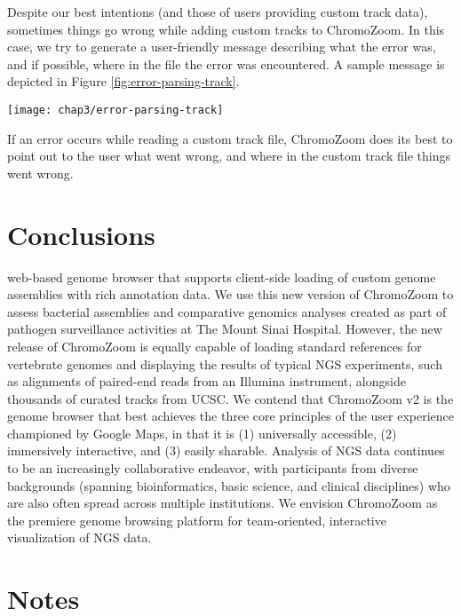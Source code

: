 Despite our best intentions (and those of users providing custom track data), sometimes things go wrong while adding custom tracks to ChromoZoom. In this case, we try to generate a user-friendly message describing what the error was, and if possible, where in the file the error was encountered. A sample message is depicted in Figure \ref{fig:error-parsing-track}.

\begin{marginfigure}
  \texttt{[image: chap3/error-parsing-track]}               
  \caption[Handling errors in parsing custom tracks]{If an error occurs while reading a custom track file, ChromoZoom does its best to point out to the user what went wrong, and where in the custom track file things went wrong.}
  \label{fig:error-parsing-track}
\end{marginfigure}

\section{Conclusions}

 web-based genome browser that supports client-side loading of custom genome assemblies with rich annotation data. We use this new version of ChromoZoom to assess bacterial assemblies and comparative genomics analyses created as part of pathogen surveillance activities at The Mount Sinai Hospital. However, the new release of ChromoZoom is equally capable of loading standard references for vertebrate genomes and displaying the results of typical NGS experiments, such as alignments of paired-end reads from an Illumina instrument, alongside thousands of curated tracks from UCSC. We contend that ChromoZoom v2 is the genome browser that best achieves the three core principles of the user experience championed by Google Maps, in that it is (1) universally accessible, (2) immersively interactive, and (3) easily sharable. Analysis of NGS data continues to be an increasingly collaborative endeavor, with participants from diverse backgrounds (spanning bioinformatics, basic science, and clinical disciplines) who are also often spread across multiple institutions. We envision ChromoZoom as the premiere genome browsing platform for team-oriented, interactive visualization of NGS data.

\section*{Notes}

